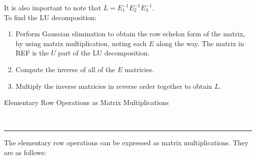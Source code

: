 \documentclass{article}
\newcommand{\header}[1]{\begin{large}\noindent #1\end{large}\\\rule{\textwidth}{0.5pt}}
\newcommand{\gap}{\medskip\\}
\begin{document}
    It is also important to note that $L = E_1^{-1}E_2^{-1}E_3^{-1}$.
    \gap
    To find the LU decomposition:
    \begin{enumerate}
        \item Perform Gaussian elimination to obtain the row echelon form of the matrix,
        by using matrix multiplication, noting each $E$ along the way. The matrix in REF
        is the $U$ part of the LU decomposition.
        \item Compute the inverse of all of the $E$ matricies.
        \item Multiply the inverse matricies in reverse order together to obtain $L$. 
    \end{enumerate} 

    \header{Elementary Row Operations as Matrix Multiplications}

    The elementary row operations can be expressed as matrix multiplications. They
    are as follows:
\end{document}
